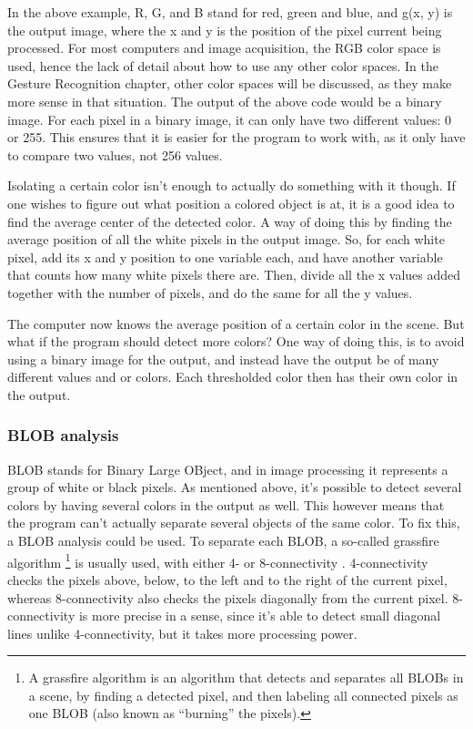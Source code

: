 In the above example, R, G, and B stand for red, green and blue, and g(x, y) is the output image, where the x and y is the position of the pixel current being processed. For most computers and image acquisition, the RGB color space is used, hence the lack of detail about how to use any other color spaces. In the Gesture Recognition chapter, other color spaces will be discussed, as they make more sense in that situation. The output of the above code would be a binary image. For each pixel in a binary image, it can only have two different values: 0 or 255. This ensures that it is easier for the program to work with, as it only have to compare two values, not 256 values.

Isolating a certain color isn’t enough to actually do something with it though. If one wishes to figure out what position a colored object is at, it is a good idea to find the average center of the detected color. A way of doing this by finding the average position of all the white pixels in the output image. So, for each white pixel, add its x and y position to one variable each, and have another variable that counts how many white pixels there are. Then, divide all the x values added together with the number of pixels, and do the same for all the y values.

The computer now knows the average position of a certain color in the scene. But what if the program should detect more colors? One way of doing this, is to avoid using a binary image for the output, and instead have the output be of many different values and or colors. Each thresholded color then has their own color in the output.

\subsubsection{BLOB analysis}
BLOB stands for Binary Large OBject, and in image processing it represents a group of white or black pixels. As mentioned above, it’s possible to detect several colors by having several colors in the output as well. This however means that the program can’t actually separate several objects of the same color. To fix this, a BLOB analysis could be used. To separate each BLOB, a so-called grassfire algorithm 
\footnote{A grassfire algorithm is an algorithm that detects and separates all BLOBs in a scene, by finding a detected pixel, and then labeling all connected pixels as one BLOB (also known as “burning” the pixels).} 
is usually used, with either 4- or 8-connectivity \parencite{Moeslund2012}. 4-connectivity checks the pixels above, below, to the left and to the right of the current pixel, whereas 8-connectivity also checks the pixels diagonally from the current pixel. 8-connectivity is more precise in a sense, since it’s able to detect small diagonal lines unlike 4-connectivity, but it takes more processing power.
\bigskip

